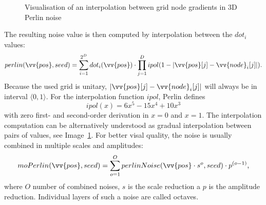\begin{figure}[H]
\begin{minipage}[t]{0.48\textwidth}
		\caption{Visualisation of an interpolation between grid node gradients in 3D Perlin noise}
		\label{perlinInterpolation}
	\end{minipage}	
\end{figure}\vspace{5mm}

The resulting noise value is then computed by interpolation between the $dot_i$ values:
\begin{equation}
	perlin(\vv{pos}, seed) = \sum_{i=1}^{2^D} dot_i(\vv{pos}) \cdot \prod_{j=1}^{D} ipol(1 - |\vv{pos}[j] - \vv{node}_i[j]|) \text{.}
\end{equation}
Because the used grid is unitary, $|\vv{pos}[j] - \vv{node}_i[j]|$ will always be in interval $\langle 0, 1 \rangle$. For the interpolation function $ipol$, Perlin \cite{PerlinKen2002In} defines
\begin{equation}
	ipol(x) = 6x^5 - 15x^4 + 10x^3
\end{equation}
with zero first- and second-order derivation in $x = 0$ and $x = 1$. The interpolation computation can be alternatively understood as gradual interpolation between pairs of values, see Image~\ref{perlinInterpolation}. For better visal quality, the noise is usually combined in multiple scales and amplitudes:
\begin{equation}
	moPerlin(\vv{pos}, seed) = \sum_{o = 1}^{O} perlinNoise(\vv{pos} \cdot s^o, seed) \cdot p^{(o-1)} \text{,}
\end{equation}
where $O$ number of combined noises, $s$ is the scale reduction a $p$ is the amplitude reduction. Individual layers of such a noise are called octaves.

